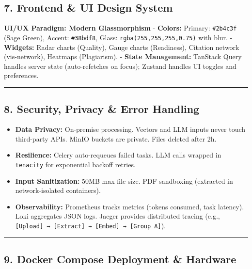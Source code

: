 \documentclass[
]{article}
\providecommand{\tightlist}{%
  \setlength{\itemsep}{0pt}\setlength{\parskip}{0pt}}
\begin{document}
\subsection{7. Frontend \& UI Design
System}\label{frontend-ui-design-system}

\textbf{UI/UX Paradigm: Modern Glassmorphism} - \textbf{Colors:}
Primary: \texttt{\#2b4c3f} (Sage Green), Accent: \texttt{\#38bdf8},
Glass: \texttt{rgba(255,255,255,0.75)} with blur. - \textbf{Widgets:}
Radar charts (Quality), Gauge charts (Readiness), Citation network
(vis-network), Heatmaps (Plagiarism). - \textbf{State Management:}
TanStack Query handles server state (auto-refetches on focus); Zustand
handles UI toggles and preferences.

\begin{center}\rule{0.5\linewidth}{0.5pt}\end{center}

\subsection{8. Security, Privacy \& Error
Handling}\label{security-privacy-error-handling}

\begin{itemize}
\tightlist
\item
  \textbf{Data Privacy:} On-premise processing. Vectors and LLM inputs
  never touch third-party APIs. MinIO buckets are private. Files deleted
  after 2h.
\item
  \textbf{Resilience:} Celery auto-requeues failed tasks. LLM calls
  wrapped in \texttt{tenacity} for exponential backoff retries.
\item
  \textbf{Input Sanitization:} 50MB max file size. PDF sandboxing
  (extracted in network-isolated containers).
\item
  \textbf{Observability:} Prometheus tracks metrics (tokens consumed,
  task latency). Loki aggregates JSON logs. Jaeger provides distributed
  tracing (e.g.,
  \texttt{{[}Upload{]}\ →\ {[}Extract{]}\ →\ {[}Embed{]}\ →\ {[}Group\ A{]}}).
\end{itemize}

\begin{center}\rule{0.5\linewidth}{0.5pt}\end{center}

\subsection{9. Docker Compose Deployment \&
Hardware}\label{docker-compose-deployment-hardware}
\end{document}
